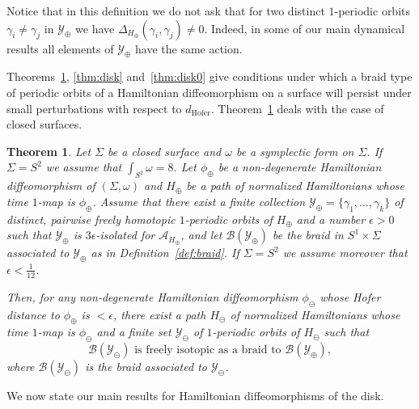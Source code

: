 \documentclass[AHL,Unicode,longabstracts,published]{cedram}
\newcommand{\hofer}{\mathrm{Hofer}}
\newcommand{\clY}{\mathcal{Y}}
\newcommand{\clA}{\mathcal{A}}
\newcommand{\clB}{\mathcal{B}}
\newtheorem{theol}{Theorem}
\newcommand{\hofer}{\mathrm{Hofer}}
\begin{document}
\begin{rema}
Notice that in this definition we do not ask that for two distinct $1$-periodic orbits $\gamma_i \neq \gamma_j$ in $\clY_\oplus$ we have $\Delta_{H_{\oplus}}(\gamma_i,\gamma_j) \neq 0$. Indeed, in some of our main dynamical results all elements of $\clY_\oplus$ have the same action.
\end{rema}

Theorems~\ref{thm:main}, \ref{thm:disk} and~\ref{thm:disk0} give conditions under which a braid type of periodic orbits of a Hamiltonian diffeomorphism on a surface will persist under small perturbations with respect to $d_{\hofer}$. Theorem~\ref{thm:main} deals with the case of closed surfaces.

\begin{theol} \label{thm:main}
Let $\Sigma$ be a closed surface and $\omega$ be a symplectic form on $\Sigma$. If $\Sigma=S^2$ we assume that $\int_{S^2}\omega =8$. Let $\phi_\oplus$ be a non-degenerate Hamiltonian diffeomorphism of $(\Sigma,\omega)$ and $H_\oplus$ be a path of normalized Hamiltonians whose time $1$-map is $\phi_\oplus$. Assume that there exist a finite collection $\clY_\oplus=\{\gamma_1,\ldots,\gamma_k\}$ of distinct, pairwise freely homotopic $1$-periodic orbits of $H_\oplus$ and a number $\epsilon>0$ such that $\clY_\oplus$ is $3\epsilon$-isolated for $\clA_{H_\oplus}$, and let $\clB(\clY_\oplus)$ be the braid in $S^1 \times \Sigma$ associated to $\clY_\oplus$ as in Definition~\ref{def:braid}. If $\Sigma = S^2 $ we assume moreover that $\epsilon < \frac{1}{12}$.

Then, for any non-degenerate Hamiltonian diffeomorphism $\phi_\ominus$ whose Hofer distance to $\phi_\oplus$ is $< \epsilon$, there exist a path $H_\ominus$ of normalized Hamiltonians whose time $1$-map is $\phi_\ominus$ and a finite set $\clY_\ominus$ of $1$-periodic orbits of $H_\ominus$ such that
\[
\clB(\clY_\ominus) \text{ is freely isotopic as a braid to } \clB(\clY_\oplus),
\]
where $\clB(\clY_\ominus)$ is the braid associated to $\clY_\ominus$.
\end{theol}


We now state our main results for Hamiltonian diffeomorphisms of the disk.
\end{document}
